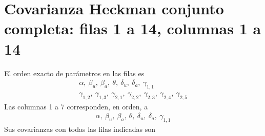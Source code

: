 \documentclass[11pt,a4paper]{article}
\begin{document}
\section{Covarianza Heckman conjunto completa: filas 1 a 14, columnas 1 a 14}
El orden exacto de parámetros en las filas es
\[
\begin{gathered}\alpha,\ \beta_u,\ \beta_a,\ \theta,\ \delta_u,\ \delta_a,\ \gamma_{1,1}\\\gamma_{1,2},\ \gamma_{1,3},\ \gamma_{2,1},\ \gamma_{2,2},\ \gamma_{2,3},\ \gamma_{2,4},\ \gamma_{2,5}\end{gathered}
\]
Las columnas 1 a 7 corresponden, en orden, a
\[
\begin{gathered}\alpha,\ \beta_u,\ \beta_a,\ \theta,\ \delta_u,\ \delta_a,\ \gamma_{1,1}\end{gathered}
\]
Sus covarianzas con todas las filas indicadas son
\end{document}
